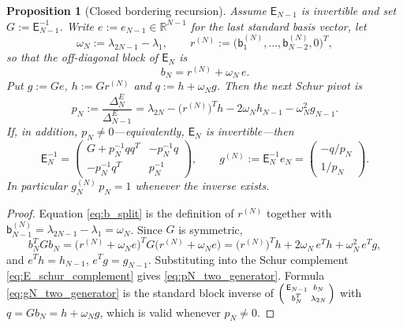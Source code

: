 \documentclass[preprint,12pt]{elsarticle}
\numberwithin{equation}{section}
\theoremstyle{plain}
\newtheorem{proposition}[theorem]{Proposition}
\theoremstyle{definition}
\theoremstyle{remark}
\newcommand{\E}{\mathsf E}
\begin{document}
\begin{proposition}[Closed bordering recursion]
\label{prop:closed_bordering}
Assume $\E_{N-1}$ is invertible and set $G:=\E_{N-1}^{-1}$.  Write $e:=e_{N-1}\in\mathbb R^{N-1}$
for the last standard basis vector, let
\begin{equation}
 \omega_N:=\lambda_{2N-1}-\lambda_1,
 \qquad
 r^{(N)}:=\bigl(\mathsf b^{(N)}_1,\dots,\mathsf b^{(N)}_{N-2},0\bigr)^T,
 \label{eq:omegaN_and_r}
\end{equation}
so that the off-diagonal block of $\E_N$ is
\begin{equation}
 b_N=r^{(N)}+\omega_N\,e .
 \label{eq:b_split}
\end{equation}
Put $g:=Ge$, $h:=Gr^{(N)}$ and $q:=h+\omega_Ng$.  Then the next Schur pivot is
\begin{equation}
 p_N:=\frac{\Delta_N^E}{\Delta_{N-1}^E}
 =\lambda_{2N}-\bigl(r^{(N)}\bigr)^Th-2\omega_N h_{N-1}-\omega_N^2 g_{N-1}.
 \label{eq:pN_two_generator}
\end{equation}
If, in addition, \(p_N\ne0\)---equivalently, \(\E_N\) is invertible---then
\begin{equation}
 \E_N^{-1}=
 \begin{pmatrix}
 G+p_N^{-1}qq^T & -p_N^{-1}q\\[2pt]
 -p_N^{-1}q^T & p_N^{-1}
 \end{pmatrix},
 \qquad
 g^{(N)}:=\E_N^{-1}e_N=\begin{pmatrix}-q/p_N\\ 1/p_N\end{pmatrix}.
 \label{eq:gN_two_generator}
\end{equation}
In particular \(g^{(N)}_N\,p_N=1\) whenever the inverse exists.
\end{proposition}

\begin{proof}
Equation \eqref{eq:b_split} is the definition of $r^{(N)}$ together with
$\mathsf b^{(N)}_{N-1}=\lambda_{2N-1}-\lambda_1=\omega_N$.  Since $G$ is symmetric,
\begin{equation}
 b_N^TGb_N
 =\bigl(r^{(N)}+\omega_Ne\bigr)^TG\bigl(r^{(N)}+\omega_Ne\bigr)
 =\bigl(r^{(N)}\bigr)^Th+2\omega_N\,e^Th+\omega_N^2\,e^Tg,
\end{equation}
and $e^Th=h_{N-1}$, $e^Tg=g_{N-1}$.  Substituting into the Schur complement
\eqref{eq:E_schur_complement} gives \eqref{eq:pN_two_generator}.  Formula
\eqref{eq:gN_two_generator} is the standard block inverse of
$\begin{psmallmatrix}\E_{N-1}&b_N\\b_N^T&\lambda_{2N}\end{psmallmatrix}$ with
$q=Gb_N=h+\omega_Ng$, which is valid whenever $p_N\ne0$.
\end{proof}
\end{document}
